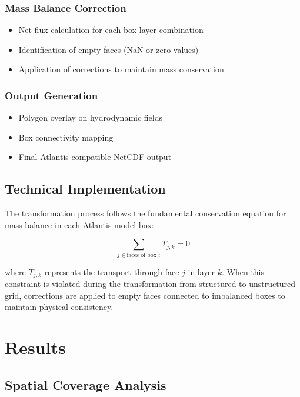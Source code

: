 \documentclass[12pt,a4paper,twoside,times,sky,formal]{csiroreport2017}
\begin{document}
\subsubsection{Mass Balance Correction}
\begin{itemize}
\item Net flux calculation for each box-layer combination
\item Identification of empty faces (NaN or zero values)
\item Application of corrections to maintain mass conservation
\end{itemize}

\subsubsection{Output Generation}
\begin{itemize}
\item Polygon overlay on hydrodynamic fields
\item Box connectivity mapping
\item Final Atlantis-compatible NetCDF output
\end{itemize}

\subsection{Technical Implementation}

The transformation process follows the fundamental conservation equation for mass balance in each Atlantis model box:

\begin{equation}
\sum_{j \in \text{faces of box } i} T_{j,k} = 0
\end{equation}

where $T_{j,k}$ represents the transport through face $j$ in layer $k$. When this constraint is violated during the transformation from structured to unstructured grid, corrections are applied to empty faces connected to imbalanced boxes to maintain physical consistency.

\section{Results}

\subsection{Spatial Coverage Analysis}
\end{document}
